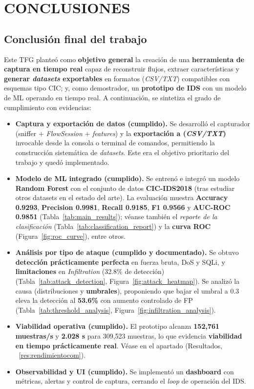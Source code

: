 \chapter{CONCLUSIONES}

\section{Conclusión final del trabajo}
Este TFG planteó como \textbf{objetivo general} la creación de una \textbf{herramienta de captura en tiempo real} capaz de reconstruir flujos, extraer características y \textbf{generar \textit{datasets} exportables} en formatos (\emph{CSV/TXT}) compatibles con esquemas tipo CIC; y, como demostrador, un \textbf{prototipo de IDS} con un modelo de ML operando en tiempo real. A continuación, se sintetiza el grado de cumplimiento con evidencias:

\begin{itemize}
  \item \textbf{Captura y exportación de datos (cumplido).} Se desarrolló el capturador (sniffer + \textit{FlowSession} + \textit{features}) y la \textbf{exportación a (\emph{CSV/TXT})} invocable desde la consola o terminal de comandos, permitiendo la construcción sistemática de \textit{datasets}. Este era el objetivo prioritario del trabajo y quedó implementado.
  \item \textbf{Modelo de ML integrado (cumplido).} Se entrenó e integró un modelo \textbf{Random Forest} con el conjunto de datos \textbf{CIC-IDS2018} (tras estudiar otros datasets en el estado del arte). La evaluación muestra \textbf{Accuracy 0.9293}, \textbf{Precision 0.9981}, \textbf{Recall 0.9185}, \textbf{F1 0.9566} y \textbf{AUC-ROC 0.9851} (Tabla~\ref{tab:main_results}); véanse también el \textit{reporte de la clasificación} (Tabla~\ref{tab:classification_report}) y la \textbf{curva ROC} (Figura~\ref{fig:roc_curve}), entre otros.
  \item \textbf{Análisis por tipo de ataque (cumplido y documentado).} Se obtuvo \textbf{detección prácticamente perfecta} en fuerza bruta, DoS y SQLi, y \textbf{limitaciones} en \textit{Infiltration} (32.8\% de detección) (Tabla~\ref{tab:attack_detection}, Figura~\ref{fig:attack_heatmap}). Se analizó la causa (distribuciones y \textbf{umbrales}), proponiendo que bajar el umbral a 0.3 eleva la detección al \textbf{53.6\%} con aumento controlado de FP (Tabla~\ref{tab:threshold_analysis}, Figura~\ref{fig:infiltration_analysis}).
  \item \textbf{Viabilidad operativa (cumplido).} El prototipo alcanza \textbf{152,761 muestras/s} y \textbf{2.028 s} para 309,523 muestras, lo que evidencia \textbf{viabilidad en tiempo prácticamente real}. Véase en el apartado (Resultados, ~\ref{res:rendimientocom}).
  \item \textbf{Observabilidad y UI (cumplido).} Se implementó un \textbf{dashboard} con métricas, alertas y control de captura, cerrando el \textit{loop} de operación del IDS.
\end{itemize}

